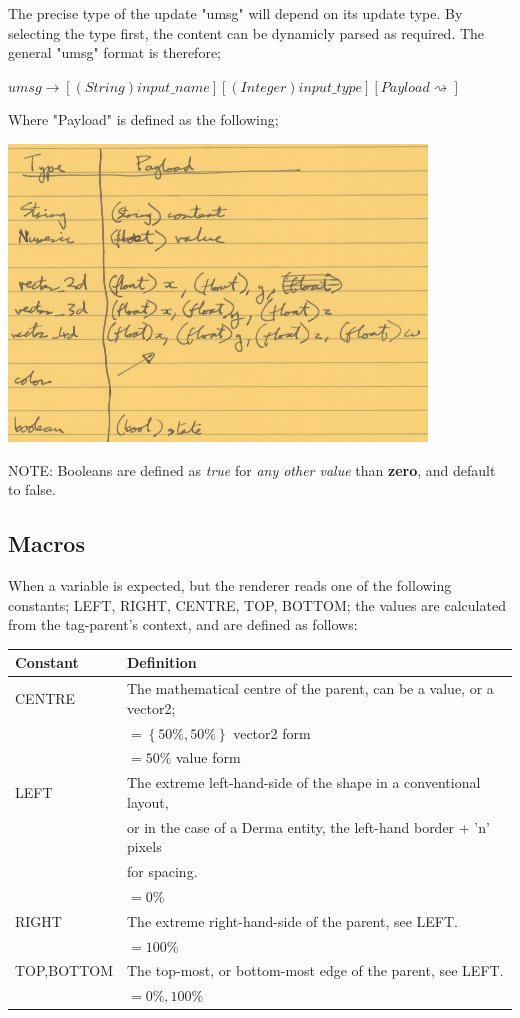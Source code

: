 \documentclass[10pt,a4paper]{article}
\begin{document}
The precise type of the update "umsg" will depend on its update type. By selecting the type first, the content can be dynamicly parsed as required.  The general "umsg" format is therefore;

	$umsg \rightarrow \left[ \left( String \right) input\_name \right] \left[ \left( Integer \right) input\_type \right] \left[ Payload \rightsquigarrow \right] $

Where "Payload" is defined as the following;

\includegraphics[scale=0.75]{images/payload_data_desc.png}

NOTE:  Booleans are defined as \textit{true} for \textit{any other value} than \textbf{zero}, and default to false.

\subsection{Macros}

When a variable is expected, but the renderer reads one of the following constants; LEFT, RIGHT, CENTRE, TOP, BOTTOM; the values are calculated from the tag-parent's context, and are defined as follows:

\begin{tabular}{|l|l|}
\hline Constant & Definition \\ 
\hline CENTRE & The mathematical centre of the parent, can be a value, or a vector2; \\
& $ = \left\lbrace 50\%,50\% \right\rbrace  $ vector2 form \\
& $ = 50\% $ value form \\ 
\hline LEFT & The extreme left-hand-side of the shape in a conventional layout, \\ 
& or in the case of a Derma entity, the left-hand border + 'n' pixels \\ 
& for spacing. \\
& $ = 0\% $ \\ 
\hline RIGHT & The extreme right-hand-side of the parent, see LEFT. \\
& $ = 100\% $ \\
\hline TOP,BOTTOM & The top-most, or bottom-most edge of the parent, see LEFT. \\
& $ = 0\%, 100\% $ \\
\hline 
\end{tabular} 
\end{document}
